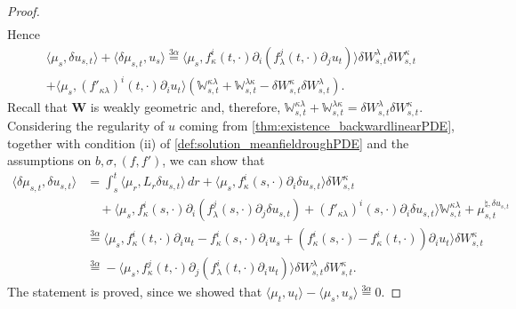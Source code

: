 \documentclass[10pt, a4paper]{article} %
\theoremstyle{definition}
\theoremstyle{plain}
\begin{document}
\begin{proof}
\begin{multline*}
    \end{multline*}
    Hence \begin{multline*}
        \langle \mu_s, \delta u_{s,t} \rangle + \langle \delta \mu_{s,t}, u_s \rangle \overset{3\alpha}{=} \langle \mu_s, f^i_\kappa (t,\cdot) \partial_i( f_\lambda^j(t,\cdot) \partial_j u_t) \rangle \delta W^\lambda_{s,t} \delta W^\kappa_{s,t}  \\ + \langle \mu_s , (f'_{\kappa \lambda})^i (t,\cdot) \partial_i u_t \rangle (\mathbb{W}^{\kappa \lambda}_{s,t} + \mathbb{W}^{\lambda \kappa}_{s,t} - \delta W^\kappa_{s,t} \delta W^\lambda_{s,t} ).
    \end{multline*}
    Recall that $\mathbf{W}$ is weakly geometric and, therefore, $\mathbb{W}^{\kappa\lambda}_{s,t} + \mathbb{W}^{\lambda\kappa}_{s,t} = \delta W^\lambda_{s,t} \delta W^\kappa_{s,t}$.
    Considering the regularity of $u$ coming from \cref{thm:existence_backwardlinearPDE}, together with condition (ii) of \cref{def:solution_meanfieldroughPDE} and the assumptions on $b,\sigma,(f,f')$,
    we can show that \begin{equation*}
        \begin{split}
            \langle \delta \mu_{s,t},  \delta u_{s,t} \rangle &= \int_s^t \langle \mu_r ,   L_r \delta u_{s,t}  \rangle \, dr + \langle \mu_s , f^i_\kappa(s,\cdot) \partial_i \delta u_{s,t} \rangle \delta W^\kappa_{s,t}  \\
            &\quad  + \langle \mu_s , f_\kappa^i (s,\cdot) \partial_i (f_\lambda^j (s,\cdot) \partial_j \delta u_{s,t}) + (f'_{\kappa\lambda})^i(s,\cdot) \partial_i \delta u_{s,t} \rangle \mathbb{W}^{\kappa\lambda}_{s,t} + \mu_{s,t}^{\natural,\delta u_{s,t}}  \\
            &\overset{3\alpha}{=} \langle \mu_s , f^i_\kappa(t,\cdot) \partial_i u_t - f^i_\kappa(s,\cdot) \partial_i u_s  + (f^i_\kappa(s,\cdot)- f^i_\kappa(t,\cdot)) \partial_i u_t \rangle \delta W^\kappa_{s,t}  \\
            &\overset{3\alpha}{=} - \langle \mu_s , f_\kappa^j (t,\cdot) \partial_j(f_\lambda^i(t,\cdot) \partial_i u_t) \rangle \delta W^\lambda_{s,t} \delta W^\kappa_{s,t}.   
        \end{split}
    \end{equation*}
    The statement is proved, since we showed that $\langle \mu_t , u_t \rangle - \langle \mu_s , u_s \rangle \overset{3\alpha}{=} 0$. 

\end{proof}
\end{document}
